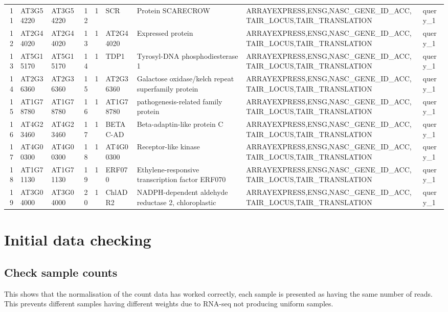 \documentclass[a4paper]{article}
\begin{document}
\begin{center}
\begin{tabular}{rllrrllll}
11 & AT3G54220 & AT3G54220 & 12 & 1 & SCR & Protein SCARECROW & ARRAYEXPRESS,ENSG,NASC\_GENE\_ID\_ACC,TAIR\_LOCUS,TAIR\_TRANSLATION & query\_1\\
12 & AT2G44020 & AT2G44020 & 13 & 1 & AT2G44020 & Expressed protein & ARRAYEXPRESS,ENSG,NASC\_GENE\_ID\_ACC,TAIR\_LOCUS,TAIR\_TRANSLATION & query\_1\\
13 & AT5G15170 & AT5G15170 & 14 & 1 & TDP1 & Tyrosyl-DNA phosphodiesterase 1 & ARRAYEXPRESS,ENSG,NASC\_GENE\_ID\_ACC,TAIR\_LOCUS,TAIR\_TRANSLATION & query\_1\\
14 & AT2G36360 & AT2G36360 & 15 & 1 & AT2G36360 & Galactose oxidase/kelch repeat superfamily protein & ARRAYEXPRESS,ENSG,NASC\_GENE\_ID\_ACC,TAIR\_LOCUS,TAIR\_TRANSLATION & query\_1\\
15 & AT1G78780 & AT1G78780 & 16 & 1 & AT1G78780 & pathogenesis-related family protein & ARRAYEXPRESS,ENSG,NASC\_GENE\_ID\_ACC,TAIR\_LOCUS,TAIR\_TRANSLATION & query\_1\\
16 & AT4G23460 & AT4G23460 & 17 & 1 & BETAC-AD & Beta-adaptin-like protein C & ARRAYEXPRESS,ENSG,NASC\_GENE\_ID\_ACC,TAIR\_LOCUS,TAIR\_TRANSLATION & query\_1\\
17 & AT4G00300 & AT4G00300 & 18 & 1 & AT4G00300 & Receptor-like kinase & ARRAYEXPRESS,ENSG,NASC\_GENE\_ID\_ACC,TAIR\_LOCUS,TAIR\_TRANSLATION & query\_1\\
18 & AT1G71130 & AT1G71130 & 19 & 1 & ERF070 & Ethylene-responsive transcription factor ERF070 & ARRAYEXPRESS,ENSG,NASC\_GENE\_ID\_ACC,TAIR\_LOCUS,TAIR\_TRANSLATION & query\_1\\
19 & AT3G04000 & AT3G04000 & 20 & 1 & ChlADR2 & NADPH-dependent aldehyde reductase 2, chloroplastic & ARRAYEXPRESS,ENSG,NASC\_GENE\_ID\_ACC,TAIR\_LOCUS,TAIR\_TRANSLATION & query\_1\\
\end{tabular}
\end{center}

\clearpage
\section{Initial data checking}
\label{sec:org490c813}

\subsection{Check sample counts}
\label{sec:org4e1d870}
This shows that the normalisation of the count data has worked correctly, each sample is presented as having the same number of reads.
This prevents different samples having different weights due to RNA-seq not producing uniform samples.
\end{document}
